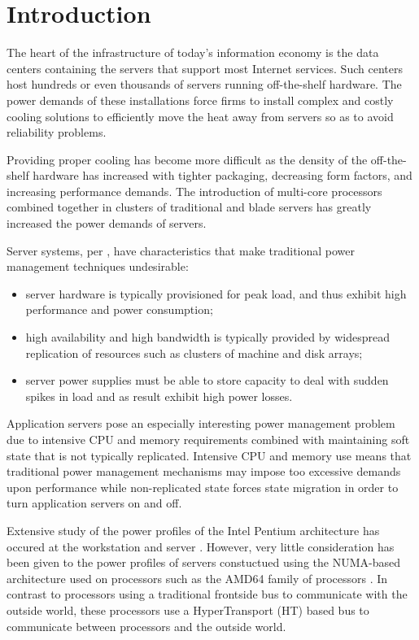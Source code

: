 \documentclass[times, 10pt,onecolumn]{article}
\begin{document}
\section{Introduction}
\label{sec:Introduction}
The heart of the infrastructure of today's information economy is the
data centers containing the servers that support most Internet services.
Such centers host hundreds or even thousands of servers running
off-the-shelf hardware.  The power demands of these installations force
firms to install complex and costly cooling solutions to efficiently
move the heat away from servers so as to avoid reliability problems.

Providing proper cooling has become more difficult as the density of the
off-the-shelf hardware has increased with tighter packaging, decreasing
form factors, and increasing performance demands.  The introduction of
multi-core processors combined together in clusters of traditional and
blade servers has greatly increased the power demands of servers.

Server systems, per \cite{Bianchini2004}, have characteristics that make
traditional power management techniques undesirable:
\begin{itemize}
\item server hardware is typically provisioned for peak load, and thus
  exhibit high performance and power consumption;
\item high availability and high bandwidth is typically provided by widespread
  replication of resources such as clusters of machine and disk arrays;
\item server power supplies must be able to store capacity to deal with sudden
  spikes in load and as result exhibit high power losses.
\end{itemize}

Application servers pose an especially interesting power management problem due
to intensive CPU and memory requirements combined with maintaining soft state
that is not typically replicated.   Intensive CPU and memory use means that
traditional power management mechanisms may impose too excessive demands upon
performance while non-replicated state forces state migration in order to turn
application servers on and off.

Extensive study of the power profiles of the Intel Pentium architecture
has occured at the workstation \cite{Isci2003a} \cite{Isci2003b}
\cite{Isci2006} and server \cite{Bircher2004} \cite{Bircher2007}
\cite{Lee2005}.  However, very little consideration has been given to
the power profiles of servers constuctued using the {NUMA}-based
architecture used on processors such as the AMD64 family of processors
\cite{AMD2007}.  In contrast
to processors using a traditional frontside bus to communicate with the
outside world, these processors use a HyperTransport (HT) based bus
\cite{HT2007} to communicate between processors and the outside world.
\end{document}
